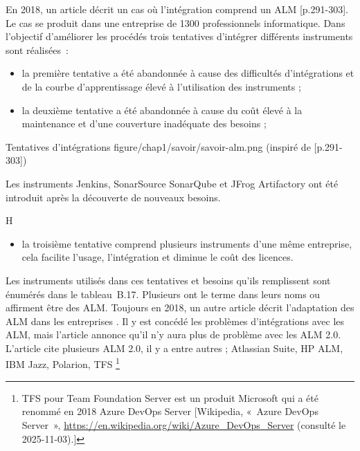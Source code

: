 {En 2018, un article décrit un cas où l'intégration comprend un ALM [p.291-303]. Le cas se produit dans une entreprise de 1300 professionnels informatique. Dans l'objectif d'améliorer les procédés trois tentatives d'intégrer différents instruments sont réalisées~:
\begin{itemize}
    \item la première tentative a été abandonnée à cause des difficultés d'intégrations et de la courbe d'apprentissage élevé à l'utilisation des instruments ;
    \item la deuxième tentative a été abandonnée à cause du coût élevé à la maintenance et d'une couverture inadéquate des besoins ;
\end{itemize}
\tabmedium
{Tentatives d'intégrations}
{figure/chap1/savoir/savoir-alm.png}
{(inspiré de [p.291-303])}
{}
{
\begin{tablenotes}
\footnotesize
\item[a] {Les instruments Jenkins, SonarSource SonarQube et JFrog Artifactory ont été introduit après la découverte de nouveaux besoins.}
\end{tablenotes}
}{H}
\begin{itemize}
    \item la troisième tentative comprend plusieurs instruments d'une même entreprise, cela facilite l'usage, l'intégration et diminue le coût des licences.
\end{itemize}

Les instruments utilisés dans ces tentatives et besoins qu'ils remplissent sont énumérés dans le tableau~B.17. Plusieurs ont le terme  dans leurs noms ou affirment être des ALM.
Toujours en 2018, un autre article décrit l'adaptation des ALM dans les entreprises \cite{tuzun_adopting_2019}. Il y est concédé les problèmes d'intégrations avec les ALM, mais l'article annonce qu'il n'y aura plus de problème avec les ALM 2.0. L'article cite plusieurs ALM 2.0, il y a entre autres ; Atlassian Suite, HP ALM, IBM Jazz, Polarion, TFS \footnote{TFS pour Team Foundation Server est un produit Microsoft qui a été renommé en 2018 Azure DevOps Server [Wikipedia, «~Azure DevOps Server~», \url{https://en.wikipedia.org/wiki/Azure_DevOps_Server} (consulté le 2025-11-03).]}
}{}

